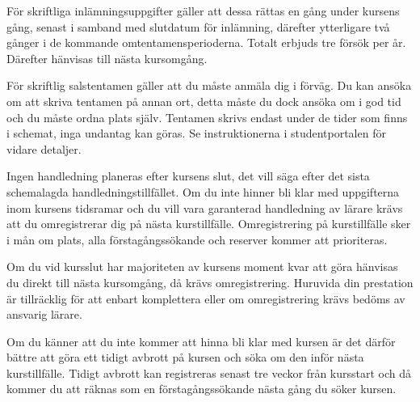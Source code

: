 \documentclass[a4paper,logo]{miunart}
\begin{document}
För skriftliga inlämningsuppgifter gäller att dessa rättas en gång under 
kursens gång, senast i samband med slutdatum för inlämning, därefter 
ytterligare två gånger i de kommande omtentamensperioderna.
Totalt erbjuds tre försök per år.
Därefter hänvisas till nästa kursomgång.

För skriftlig salstentamen gäller att du måste anmäla dig i förväg.
Du kan ansöka om att skriva tentamen på annan ort, detta måste du dock ansöka 
om i god tid och du måste ordna plats själv.
Tentamen skrivs endast under de tider som finns i schemat, inga undantag kan 
göras.
Se instruktionerna i studentportalen för vidare detaljer.

Ingen handledning planeras efter kursens slut, det vill säga efter det sista 
schemalagda handledningstillfället.
Om du inte hinner bli klar med uppgifterna inom kursens tidsramar och du vill 
vara garanterad handledning av lärare krävs att du omregistrerar dig på nästa 
kurstillfälle.
Omregistrering på kurstillfälle sker i mån om plats, alla förstagångssökande 
och reserver kommer att prioriteras.

Om du vid kursslut har majoriteten av kursens moment kvar att göra hänvisas du 
direkt till nästa kursomgång, då krävs omregistrering.
Huruvida din prestation är tillräcklig för att enbart komplettera eller om 
omregistrering krävs bedöms av ansvarig lärare.

Om du känner att du inte kommer att hinna bli klar med kursen är det därför 
bättre att göra ett tidigt avbrott på kursen och söka om den inför nästa 
kurstillfälle.
Tidigt avbrott kan registreras senast tre veckor från kursstart och då kommer 
du att räknas som en förstagångssökande nästa gång du söker kursen.


\printbibliography
\end{document}

